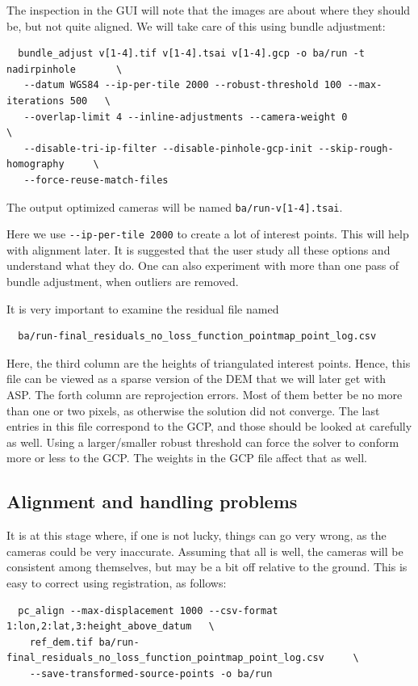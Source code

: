 The inspection in the GUI will note that the images are about where they
should be, but not quite aligned. We will take care of this using bundle
adjustment:

\begin{verbatim}
  bundle_adjust v[1-4].tif v[1-4].tsai v[1-4].gcp -o ba/run -t nadirpinhole       \
   --datum WGS84 --ip-per-tile 2000 --robust-threshold 100 --max-iterations 500   \
   --overlap-limit 4 --inline-adjustments --camera-weight 0                       \
   --disable-tri-ip-filter --disable-pinhole-gcp-init --skip-rough-homography     \
   --force-reuse-match-files
\end{verbatim}

The output optimized cameras will be named \texttt{ba/run-v[1-4].tsai}.

Here we use \texttt{-\/-ip-per-tile 2000} to create a lot of interest
points. This will help with alignment later. It is suggested that the
user study all these options and understand what they do. 
One can also experiment with more than one pass of bundle adjustment,
when outliers are removed. 

It is very important to examine the residual file named
\begin{verbatim}
  ba/run-final_residuals_no_loss_function_pointmap_point_log.csv
\end{verbatim}
Here, the third column are the heights of triangulated interest
points. Hence, this file can be viewed as a sparse version of the DEM
that we will later get with ASP. The forth column are reprojection
errors. Most of them better be no more than one or two pixels, as
otherwise the solution did not converge. The last entries in this
file correspond to the GCP, and those should be looked at carefully as well.
Using a larger/smaller robust threshold can force the solver to 
conform more or less to the GCP. The weights in the GCP file affect that as well.

\subsection{Alignment and handling problems}

It is at this stage where, if one is not lucky, things can go very
wrong, as the cameras could be very inaccurate. Assuming that all is
well, the cameras will be consistent among themselves, but may be a bit
off relative to the ground. This is easy to correct using registration,
as follows:
\begin{verbatim}
  pc_align --max-displacement 1000 --csv-format 1:lon,2:lat,3:height_above_datum   \
    ref_dem.tif ba/run-final_residuals_no_loss_function_pointmap_point_log.csv     \
    --save-transformed-source-points -o ba/run
\end{verbatim}

